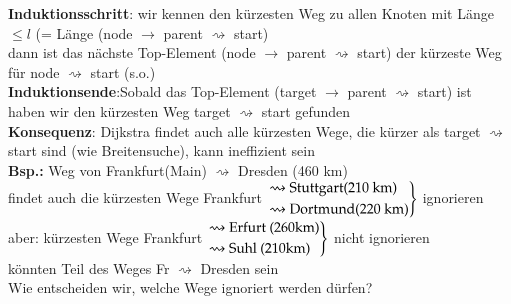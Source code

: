         \textbf{Induktionsschritt}: wir kennen den kürzesten Weg zu allen Knoten mit Länge $\leq l$ (= Länge (node $\rightarrow$ parent $\rightsquigarrow$ start)\\
        dann ist das nächste Top-Element (node $\rightarrow$ parent $\rightsquigarrow$ start) der kürzeste Weg für node $\rightsquigarrow$ start (s.o.) \\

        \textbf{Induktionsende}:Sobald das Top-Element (target $\rightarrow$ parent $\rightsquigarrow$ start) ist haben wir den kürzesten Weg target $\rightsquigarrow$ start gefunden\\

        \textbf{Konsequenz}: Dijkstra findet auch alle kürzesten Wege, die kürzer als target $\rightsquigarrow$ start sind (wie Breitensuche), kann ineffizient sein\\

        \textbf{Bsp.:} Weg von Frankfurt(Main) $\rightsquigarrow$ Dresden (460 km)\\
        \hspace*{0.5cm} findet auch die kürzesten Wege Frankfurt $\begin{rcases}\rightsquigarrow \text{Stuttgart(210 km)} \\ \rightsquigarrow
        \text{Dortmund(220 km)} \end{rcases}$ ignorieren\\

        \hspace*{0.5cm} aber: kürzesten Wege Frankfurt $\begin{rcases} \rightsquigarrow \text{Erfurt (260km)} \\
        \rightsquigarrow \text{Suhl (210km)} \end{rcases}$ nicht ignorieren \\
        \hspace*{0.5cm} könnten Teil des Weges Fr $\rightsquigarrow$ Dresden sein\\

        Wie entscheiden wir, welche Wege ignoriert werden dürfen?



